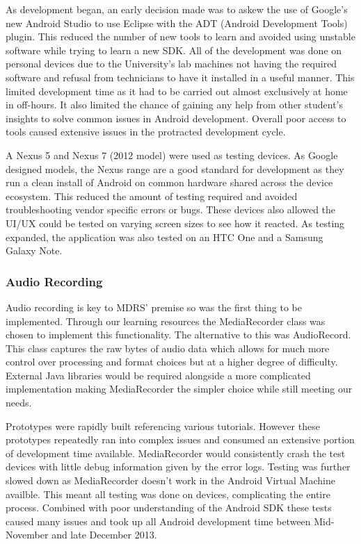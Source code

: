 \documentclass{l3proj}
\begin{document}
As development began, an early decision made was to askew the use of Google's new Android Studio to use Eclipse with the ADT (Android Development Tools) plugin. This reduced the number of new tools to learn and avoided using unstable software while trying to learn a new SDK. All of the development was done on personal devices due to the University's lab machines not having the required software and refusal from technicians to have it installed in a useful manner. This limited development time as it had to be carried out almost exclusively at home in off-hours. It also limited the chance of gaining any help from other student's insights to solve common issues in Android development. Overall poor access to tools caused extensive issues in the protracted  development cycle.

A Nexus 5 and Nexus 7 (2012 model) were used as testing devices. As Google designed models, the Nexus range are a good standard for development as they run a clean install of Android on common hardware shared across the device ecosystem. This reduced the amount of testing required and avoided troubleshooting vendor specific errors or bugs. These devices also allowed the UI/UX could be tested on varying screen sizes to see how it reacted. As testing expanded, the application was also tested on an HTC One and a Samsung Galaxy Note.

\subsubsection{Audio Recording}    Audio recording is key to MDRS' premise so was the first thing to be implemented. Through our learning resources the MediaRecorder class was chosen to implement this functionality. The alternative to this was AudioRecord. This class captures the raw bytes of audio data which allows for much more control over processing and format choices but at a higher degree of difficulty. External Java libraries would be required alongside a more complicated implementation making MediaRecorder the simpler choice while still meeting our needs.

Prototypes were rapidly built referencing various tutorials. However these prototypes repeatedly ran into complex issues and consumed an extensive portion of development time available. MediaRecorder would consistently crash the test devices with little debug information given by the error logs. Testing was further slowed down as MediaRecorder doesn't work in the Android Virtual Machine availble. This meant all testing was done on devices, complicating the entire process. Combined with poor understanding of the Android SDK these tests caused many issues and took up all Android development time between Mid-November and late December 2013.
\end{document}
